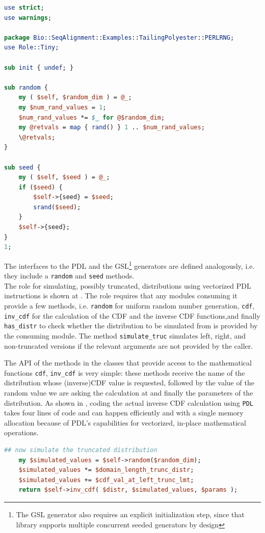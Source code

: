 \documentclass[10pt]{article}
\begin{document}
\begin{lstlisting}[language=Perl,basicstyle=\footnotesize,frame=single,caption={A simple OO API for random number generation.},label={lst:OORNG},captionpos=b]
use strict;
use warnings;

package Bio::SeqAlignment::Examples::TailingPolyester::PERLRNG;
use Role::Tiny;

sub init { undef; }

sub random {
    my ( $self, $random_dim ) = @_;
    my $num_rand_values = 1;
    $num_rand_values *= $_ for @$random_dim;
    my @retvals = map { rand() } 1 .. $num_rand_values;
    \@retvals;
}

sub seed {
    my ( $self, $seed ) = @_;
    if ($seed) {
        $self->{seed} = $seed;
        srand($seed);
    }
    $self->{seed};
}
1;
\end{lstlisting}
The interfaces to the PDL and the GSL\footnote{The GSL generator also requires an explicit initialization step, since that library supports multiple concurrent seeded generators by design} generators are defined analogously, i.e. they include a \texttt{random} and \texttt{seed} methods.
\\
The role for simulating, possibly truncated, distributions using vectorized PDL instructions is shown at . The role requires that any modules consuming it provide a few methods, i.e.  \texttt{random} for uniform random number generation,  \texttt{cdf}, \texttt{inv\_cdf} for the calculation of the CDF and the inverse CDF functions,and finally  \texttt{has\_distr} to check whether the distribution to be simulated from is provided  by the consuming module. The method \texttt{simulate\_truc} simulates left, right, and non-truncated versions if the relevant arguments are not provided by the caller. 


The API of the methods in the classes that provide access to the mathematical functions \texttt{cdf}, \texttt{inv\_cdf}  is very simple: these methods receive the name of the distribution whose (inverse)CDF value is requested, followed by the value of the random value we are asking the calculation at and finally the parameters of the distribution. 
As shown in , coding the actual inverse CDF calculation using \texttt{PDL} takes four lines of code and can happen efficiently and with a single memory allocation because of PDL's capabilities for vectorized, in-place mathematical operations.
\begin{lstlisting}[language=Perl,basicstyle=\footnotesize,frame=none,caption={The inverse CDF calculations in  PDL.},label={lst:InvCDFWithPDL},captionpos=b]
    ## now simulate the truncated distribution
    my $simulated_values = $self->random($random_dim);
    $simulated_values *= $domain_length_trunc_distr;
    $simulated_values += $cdf_val_at_left_trunc_lmt;
    return $self->inv_cdf( $distr, $simulated_values, $params );
\end{lstlisting}
\end{document}
